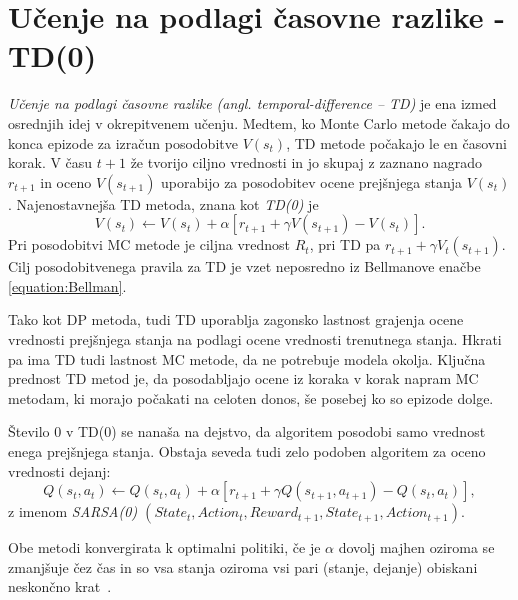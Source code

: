 \documentclass[a4paper, oneside, 12pt]{report}
\begin{document}
\section{Učenje na podlagi časovne razlike - TD(0)} \label{subsection:TD0Prediction} %
{\em Učenje na podlagi časovne razlike (angl. temporal-difference -- TD)} je ena izmed osrednjih idej v okrepitvenem učenju. Medtem, ko Monte Carlo metode čakajo do konca epizode za izračun posodobitve $V(s_t)$, TD metode počakajo le en časovni korak. V času $t+1$ že tvorijo ciljno vrednosti in jo skupaj z zaznano nagrado $r_{t+1}$ in oceno $V(s_{t+1})$ uporabijo za posodobitev ocene prejšnjega stanja $V(s_t)$. Najenostavnejša TD metoda, znana kot {\em TD(0)} je
\begin{equation}
V(s_t) \gets V(s_t) + \alpha[r_{t+1} + \gamma V(s_{t+1}) - V(s_t)].
\end{equation}
Pri posodobitvi MC metode je ciljna vrednost $R_t$, pri TD pa $r_{t+1} + \gamma V_t(s_{t+1})$. Cilj posodobitvenega pravila za TD je vzet neposredno iz Bellmanove enačbe \eqref{equation:Bellman}.

Tako kot DP metoda, tudi TD uporablja zagonsko lastnost grajenja ocene vrednosti prejšnjega stanja na podlagi ocene vrednosti trenutnega stanja. Hkrati pa ima TD tudi lastnost MC metode, da ne potrebuje modela okolja. Ključna prednost TD metod je, da posodabljajo ocene iz koraka v korak napram MC metodam, ki morajo počakati na celoten donos, še posebej ko so epizode dolge.


Število 0 v TD(0) se nanaša na dejstvo, da algoritem posodobi samo vrednost enega prejšnjega stanja. Obstaja seveda tudi zelo podoben algoritem za oceno vrednosti dejanj:
\begin{equation}
Q(s_t, a_t) \gets Q(s_t, a_t) + \alpha[r_{t+1} + \gamma Q(s_{t+1}, a_{t+1}) - Q(s_t, a_t)],
\end{equation}
z imenom {\em SARSA(0) $(State_t, Action_t, Reward_{t+1}, State_{t+1}, Action_{t+1})$}.


Obe metodi konvergirata k optimalni politiki, če je $\alpha$ dovolj majhen oziroma se zmanjšuje čez čas in so vsa stanja oziroma vsi pari (stanje, dejanje) obiskani neskončno krat~\cite{LearningWithoutStateEstimationInPartiallyObservableMarkovianDecisionProcesses}.
\end{document}
